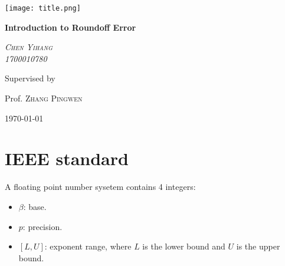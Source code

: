 \documentclass[12pt,a4paper]{extarticle}
\numberwithin{equation}{section}
\numberwithin{figure}{section}
\numberwithin{table}{section}
\theoremstyle{definition}
\begin{document}
\begin{titlepage}
\addtolength{\hoffset}{0cm}
    \centering
    \texttt{[image: title.png]}\par\vspace{1cm}
    {\huge\bfseries Introduction to Roundoff Error \par}
    \vspace{2cm}
    {\Large\itshape \textsc{Chen Yihang}\\{ 1700010780}\par}
    \vfill
    Supervised by \par
    Prof. \textsc{Zhang Pingwen} 
    \vfill
    {\large \today\par}
\end{titlepage}
\footnotesize

\newpage
\section{IEEE standard}
A floating point number sysetem contains 4 integers:
\begin{itemize}
   \item $\beta$: base.
   \item $p$: precision.
   \item $[L,U]$: exponent range, where $L$ is the lower bound and $U$ is the upper bound.
\end{itemize}
\end{document}
